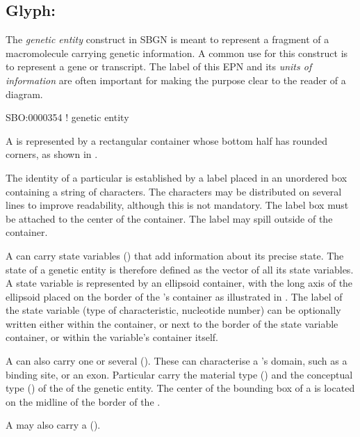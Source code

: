 
\subsection{Glyph: }
\label{sec:genetic}

The \emph{genetic entity} construct in SBGN is meant to represent a fragment of a macromolecule carrying genetic information.  A common use for this construct is to represent a gene or transcript.  The label of this EPN and its \emph{units of information} are often important for making the purpose clear to the reader of a diagram.

\begin{glyphDescription}

\glyphSboTerm SBO:0000354 ! genetic entity

\glyphContainer A  is represented by a rectangular container whose bottom half has rounded corners, as shown in .

\glyphLabel The identity of a particular  is established by a label placed in an unordered box containing a string of characters.  The characters may be distributed on several lines to improve readability, although this is not mandatory.  The label box must be attached to the center of the container.  The label may spill outside of the container.

\glyphAux A  can carry state variables () that add information about its precise state.  The state of a genetic entity is therefore defined as the vector of all its state variables.  A state variable is represented by an ellipsoid container, with the long axis of the ellipsoid placed on the border of the 's container as illustrated in .  The label of the state variable (type of characteristic, nucleotide number) can be optionally written either within the  container, or next to the border of the state variable container, or within the variable's container itself.

A  can also carry one or several  ().  These can characterise a 's domain, such as a binding site, or an exon.  Particular  carry the material type () and the conceptual type () of the of the genetic entity.  The center of the bounding box of a  is located on the midline of the border of the .

A  may also carry a 
().

\end{glyphDescription}


